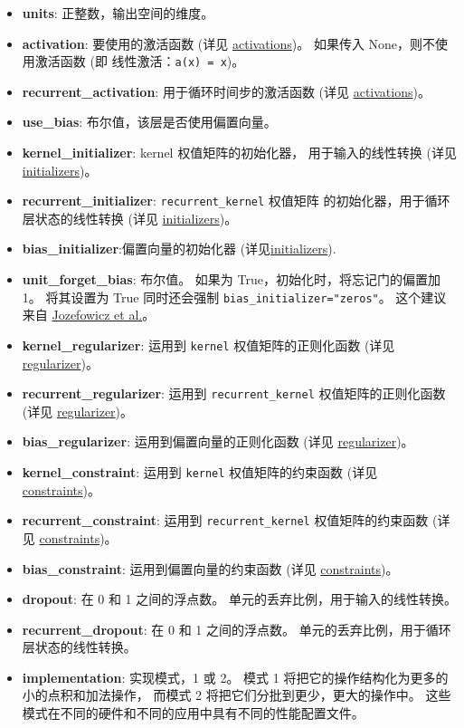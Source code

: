 \begin{itemize}
\tightlist
\item
  \textbf{units}: 正整数，输出空间的维度。
\item
  \textbf{activation}: 要使用的激活函数 (详见
  \hyperref[activations]{activations})。 如果传入
  None，则不使用激活函数 (即 线性激活：\texttt{a(x)\ =\ x})。
\item
  \textbf{recurrent\_activation}: 用于循环时间步的激活函数 (详见
  \hyperref[activations]{activations})。
\item
  \textbf{use\_bias}: 布尔值，该层是否使用偏置向量。
\item
  \textbf{kernel\_initializer}: kernel 权值矩阵的初始化器，
  用于输入的线性转换 (详见 \hyperref[initializers]{initializers})。
\item
  \textbf{recurrent\_initializer}: \texttt{recurrent\_kernel} 权值矩阵
  的初始化器，用于循环层状态的线性转换 (详见
  \hyperref[initializers]{initializers})。
\item
  \textbf{bias\_initializer}:偏置向量的初始化器
  (详见\hyperref[initializers]{initializers}).
\item
  \textbf{unit\_forget\_bias}: 布尔值。 如果为
  True，初始化时，将忘记门的偏置加 1。 将其设置为 True 同时还会强制
  \texttt{bias\_initializer="zeros"}。 这个建议来自
  \href{http://www.jmlr.org/proceedings/papers/v37/jozefowicz15.pdf}{Jozefowicz
  et al.}。
\item
  \textbf{kernel\_regularizer}: 运用到 \texttt{kernel}
  权值矩阵的正则化函数 (详见 \hyperref[regularizers]{regularizer})。
\item
  \textbf{recurrent\_regularizer}: 运用到 \texttt{recurrent\_kernel}
  权值矩阵的正则化函数 (详见 \hyperref[regularizers]{regularizer})。
\item
  \textbf{bias\_regularizer}: 运用到偏置向量的正则化函数 (详见
  \hyperref[regularizers]{regularizer})。
\item
  \textbf{kernel\_constraint}: 运用到 \texttt{kernel} 权值矩阵的约束函数
  (详见 \hyperref[constraints]{constraints})。
\item
  \textbf{recurrent\_constraint}: 运用到 \texttt{recurrent\_kernel}
  权值矩阵的约束函数 (详见 \hyperref[constraints]{constraints})。
\item
  \textbf{bias\_constraint}: 运用到偏置向量的约束函数 (详见
  \hyperref[constraints]{constraints})。
\item
  \textbf{dropout}: 在 0 和 1 之间的浮点数。
  单元的丢弃比例，用于输入的线性转换。
\item
  \textbf{recurrent\_dropout}: 在 0 和 1 之间的浮点数。
  单元的丢弃比例，用于循环层状态的线性转换。
\item
  \textbf{implementation}: 实现模式，1 或 2。 模式 1
  将把它的操作结构化为更多的小的点积和加法操作， 而模式 2
  将把它们分批到更少，更大的操作中。
  这些模式在不同的硬件和不同的应用中具有不同的性能配置文件。
\end{itemize}




